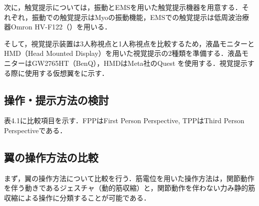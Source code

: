 \begin{small}
    次に，触覚提示については，振動とEMSを用いた触覚提示機器を用意する．それぞれ，振動での触覚提示はMyoの振動機能，EMSでの触覚提示は低周波治療器Omron HV-F122（）を用いる．


    そして，視覚提示装置は3人称視点と1人称視点を比較するため，液晶モニターとHMD（Head Mounted Display）を用いた視覚提示の2種類を準備する．液晶モニターはGW2765HT（BenQ），HMDはMeta社のQuest
    を使用する．視覚提示する際に使用する仮想翼をに示す．

  \subsection{操作・提示方法の検討}

    \begin{table}[tb]
        \begin{center}
            \caption{Comparison items}
        \end{center}
    \end{table}

    表4.1に比較項目を示す．FPPはFirst Person Perspective, TPPはThird Person Perspectiveである．


   \subsection{翼の操作方法の比較} %
      まず，翼の操作方法について比較を行う．筋電位を用いた操作方法は，関節動作を伴う動きであるジェスチャ（動的筋収縮）と，関節動作を伴わない力み静的筋収縮\cite{thistle1967isokinetic}による操作に分類することが可能である．


\end{small}
